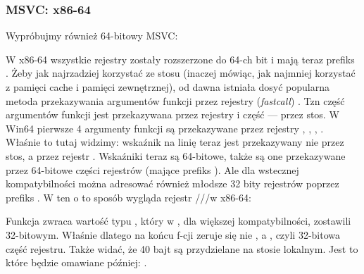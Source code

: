 \subsubsection{MSVC: x86-64}

Wypróbujmy również 64-bitowy MSVC:




W x86-64 wszystkie rejestry zostały rozszerzone do 64-ch bit i mają teraz prefiks .
Żeby jak najrzadziej korzystać ze stosu (inaczej mówiąc, jak najmniej korzystać z pamięci cache i pamięci zewnętrznej), od dawna istniała dosyć popularna metoda przekazywania argumentów funkcji przez rejestry (\emph{fastcall}) .
Tzn część argumentów funkcji jest przekazywana przez rejestry i część --- przez stos.
W Win64 pierwsze 4 argumenty funkcji są przekazywane przez rejestry \RCX, \RDX, , .
Właśnie to tutaj widzimy: wskaźnik na linię \printf teraz jest przekazywany nie przez stos, a przez rejestr \RCX.
Wskaźniki teraz są 64-bitowe, także są one przekazywane przez 64-bitowe części rejestrów (mające prefiks ).
Ale dla wstecznej kompatybilności można adresować również młodsze 32 bity rejestrów poprzez prefiks .
W ten o to sposób wygląda rejestr \RAX/\EAX/\AX/\AL w x86-64:


Funkcja \main zwraca wartość typu \Tint, który w \CCpp, dla większej kompatybilności,
zostawili 32-bitowym. Właśnie dlatego na końcu f-cji \main zeruje się nie \RAX, a \EAX, czyli 32-bitowa część rejestru.
Także widać, że 40 bajt są przydzielane na stosie lokalnym.
Jest to  które będzie omawiane później: .

